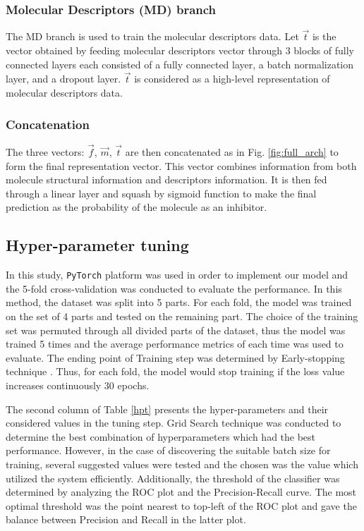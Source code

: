 \documentclass[conference]{IEEEtran}
\begin{document}
\subsubsection{Molecular Descriptors (MD) branch}
The MD branch is used to train the molecular descriptors data. Let $\Vec{t}$ is the vector obtained by feeding molecular descriptors vector through 3 blocks of fully connected layers each consisted of a fully connected layer, a batch normalization layer, and a dropout layer. $\Vec{t}$ is considered as a high-level representation of molecular descriptors data. 

\subsubsection{Concatenation}
The three vectors: $\Vec{f}$, $\Vec{m}$, $\Vec{t}$ are then concatenated as in Fig. \ref{fig:full_arch} to form the final representation vector. This vector combines information from both molecule structural information and descriptors information. It is then fed through a linear layer and squash by sigmoid function to make the final prediction as the probability of the molecule as an inhibitor.

\subsection{Hyper-parameter tuning}
In this study, \texttt{PyTorch} platform \cite{paszke2017} was used in order to implement our model and the 5-fold cross-validation was conducted to evaluate the performance. In this method, the dataset was split into 5 parts. For each fold, the model was trained on the set of 4 parts and tested on the remaining part. The choice of the training set was permuted through all divided parts of the dataset, thus the model was trained 5 times and the average performance metrics of each time was used to evaluate. The ending point of Training step was determined by Early-stopping technique \cite{Finnoff1993, Prechelt1998}. Thus, for each fold, the model would stop training if the loss value increases continuously 30 epochs. 

The second column of Table \ref{hpt} presents the hyper-parameters and their considered values in the tuning step. Grid Search technique was conducted to determine the best combination of hyperparameters which had the best performance. However, in the case of discovering the suitable batch size for training, several suggested values were tested and the chosen was the value which utilized the system efficiently. Additionally, the threshold of the classifier was determined by analyzing the ROC plot and the Precision-Recall curve. The most optimal threshold was the point nearest to top-left of the ROC plot and gave the balance between Precision and Recall in the latter plot.
\end{document}
